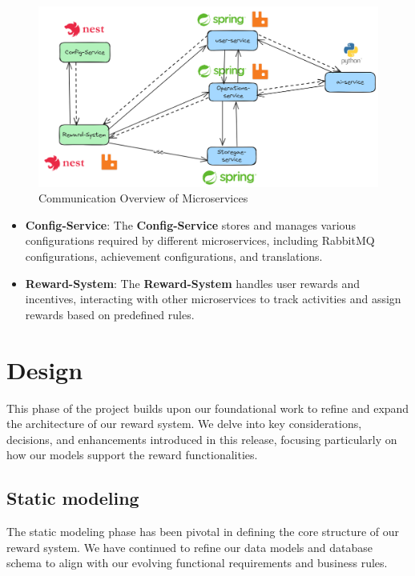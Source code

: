\begin{figure}[h]
    \centering
    \includegraphics[width=1\textwidth]{src/assets/diagrams/microservicesComm.png}
    \caption{Communication Overview of Microservices}
    \label{fig:microservices}
\end{figure}

\begin{itemize}
    \item \textbf{Config-Service}: The \textbf{Config-Service} stores and manages various configurations required by different microservices, including RabbitMQ configurations, achievement configurations, and translations.
    
    \item \textbf{Reward-System}: The \textbf{Reward-System} handles user rewards and incentives, interacting with other microservices to track activities and assign rewards based on predefined rules.
\end{itemize}

\section{Design}
This phase of the project builds upon our foundational work to refine and expand the architecture of our reward system. We delve into key considerations, decisions, and enhancements introduced in this release, focusing particularly on how our models support the reward functionalities.


\subsection{Static modeling}
The static modeling phase has been pivotal in defining the core structure of our reward system. We have continued to refine our data models and database schema to align with our evolving functional requirements and business rules.


